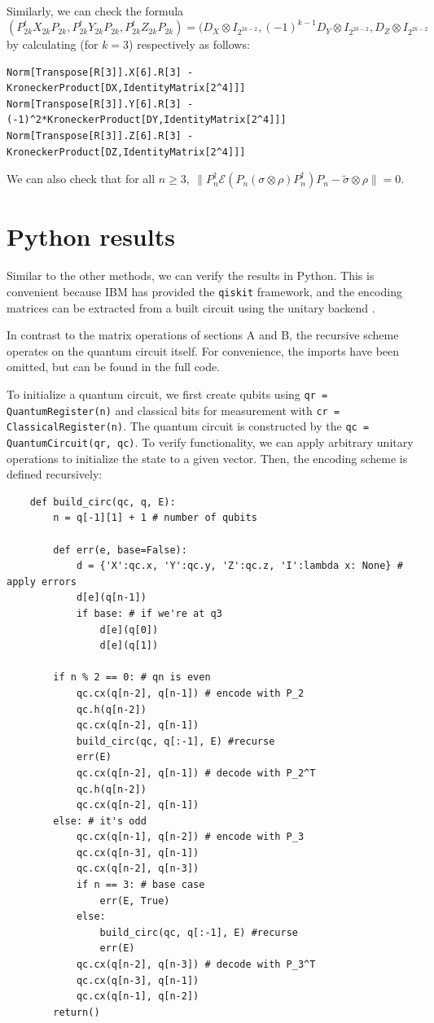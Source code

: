 \documentclass[11pt]{article}
\def\cE{{\mathcal E}}
\begin{document}
\noindent Similarly, we can check the formula
$$(P_{2k}^t X_{2k}P_{2k}, P_{2k}^t Y_{2k}P_{2k}, 
P_{2k}^t Z_{2k}P_{2k}) 
= 
 (D_X \otimes I_{2^{2k-2}}, (-1)^{k-1}D_Y \otimes I_{2^{2k-2}}, 
 D_Z \otimes I_{2^{2k-2}} $$
by calculating (for $k=3$) respectively as follows:
\begin{verbatim}
Norm[Transpose[R[3]].X[6].R[3] - KroneckerProduct[DX,IdentityMatrix[2^4]]]
Norm[Transpose[R[3]].Y[6].R[3] - (-1)^2*KroneckerProduct[DY,IdentityMatrix[2^4]]]
Norm[Transpose[R[3]].Z[6].R[3] - KroneckerProduct[DZ,IdentityMatrix[2^4]]]
\end{verbatim}

\noindent We can also check that for all $n\ge 3,\ \|P_n^\dag \cE( P_n (\sigma \otimes \rho) P_n^\dag) P_n  
-\tilde \sigma \otimes \rho\|=0$.



\section{Python results}
Similar to the other methods, we can verify the results in Python. 
This is convenient because IBM has provided the \verb|qiskit| framework, and the encoding matrices can be extracted from a built circuit using the unitary backend \cite{qiskit}.

In contrast to the matrix operations of sections A and B, the recursive scheme operates on the quantum circuit itself. For convenience, the imports have been omitted, but can be found in the full code.

To initialize a quantum circuit, we first create qubits using \verb|qr = QuantumRegister(n)| and classical bits for measurement with \verb|cr = ClassicalRegister(n)|. The quantum circuit is constructed by the \verb|qc = QuantumCircuit(qr, qc)|. To verify functionality, we can apply arbitrary unitary operations to initialize the state to a given vector. Then, the encoding scheme is defined recursively:

\begin{verbatim}
    def build_circ(qc, q, E):
        n = q[-1][1] + 1 # number of qubits

        def err(e, base=False):
            d = {'X':qc.x, 'Y':qc.y, 'Z':qc.z, 'I':lambda x: None} # apply errors
            d[e](q[n-1])
            if base: # if we're at q3
                d[e](q[0])
                d[e](q[1])
        
        if n % 2 == 0: # qn is even
            qc.cx(q[n-2], q[n-1]) # encode with P_2
            qc.h(q[n-2])
            qc.cx(q[n-2], q[n-1])
            build_circ(qc, q[:-1], E) #recurse
            err(E)
            qc.cx(q[n-2], q[n-1]) # decode with P_2^T
            qc.h(q[n-2])
            qc.cx(q[n-2], q[n-1])
        else: # it's odd
            qc.cx(q[n-1], q[n-2]) # encode with P_3
            qc.cx(q[n-3], q[n-1])
            qc.cx(q[n-2], q[n-3])
            if n == 3: # base case
                err(E, True)
            else:
                build_circ(qc, q[:-1], E) #recurse
                err(E)
            qc.cx(q[n-2], q[n-3]) # decode with P_3^T
            qc.cx(q[n-3], q[n-1])
            qc.cx(q[n-1], q[n-2])
        return()
\end{verbatim}
\end{document}
